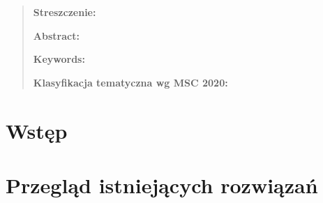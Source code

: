 \documentclass[12pt,oneside]{report}
\begin{document}
	\thispagestyle{empty}
	\mbox{}
	
	\begin{quote}{\small 
			\noindent
			
			\bigskip
			\noindent
			\textbf{Streszczenie:} 
			
			
			\noindent
			\newline
			\textbf{}
			\vspace{5pt}
			
			\noindent
			\newline
			\textbf{Abstract:} 
			\vspace{5pt}
			
			\vspace{5pt}
			\noindent
			\newline
			\textbf{Keywords:} 
			\vspace{5pt}
			\bigskip
			
			\noindent 
			\textbf{Klasyfikacja tematyczna wg  MSC 2020:}}
	\end{quote}

	\mbox{}
	
	\pagestyle{plain}
	\tableofcontents
	\thispagestyle{empty}
	
	
	\newpage
	\setcounter{page}{1}
	\newpage
\chapter{Wstęp}
\chapter{Przegląd istniejących rozwiązań}
\end{document}
